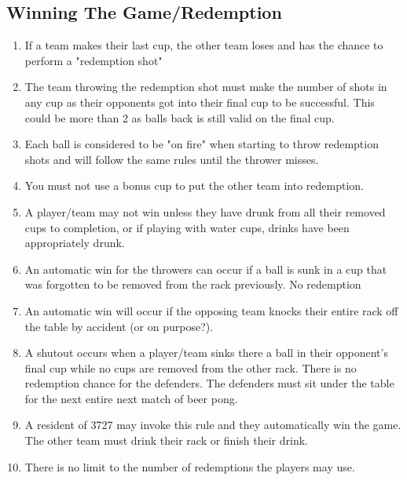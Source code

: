 	\subsection{Winning The Game/Redemption}\label{ssec:Winning}
        \begin{enumerate}[label=(\roman*)]
            \item \label{sssec:Winning,lastcup} If a team makes their last cup, the other team loses and has the chance to perform a "redemption shot"
            \item \label{sssec:Winning,redemption} The team throwing the redemption shot must make the number of shots in any cup as their opponents got into their final cup to be successful.
                This could be more than 2 as balls back is still valid on the final cup.
            \item \label{sssec:Winning,onfire} Each ball is considered to be "on fire" when starting to throw redemption shots and will follow the same rules until the thrower misses.
            \item \label{sssec:Winning,specialshot} You must not use a bonus cup to put the other team into redemption.
            \item \label{sssec:Winning,drinking} A player/team may not win unless they have drunk from all their removed cups to completion, or if playing with water cups, drinks have been appropriately drunk. 
            \item \label{sssec:Winning,death/killcups} An automatic win for the throwers can occur if a ball is sunk in a cup that was forgotten to be removed from the rack previously.
                No redemption
            \item \label{sssec:Winning,knockovers} An automatic win will occur if the opposing team knocks their entire rack off the table by accident (or on purpose?).
            \item \label{sssec:Winning,shutout} A shutout occurs when a player/team sinks there a ball in their opponent's final cup while no cups are removed from the other rack.
                There is no redemption chance for the defenders.
                The defenders must sit under the table for the next entire next match of beer pong.
            \item \label{sssec:ResidentWins} A resident of 3727 may invoke this rule and they automatically win the game.
                The other team must drink their rack or finish their drink.
            \item \label{sssec:Winning,no.Redemtions} There is no limit to the number of redemptions the players may use.
        \end{enumerate}